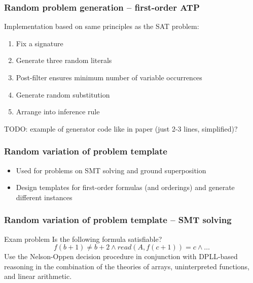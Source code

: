 \documentclass[xcolor={table}]{beamer}
\begin{document}
\begin{frame}
    \frametitle{Random problem generation -- first-order ATP}

    Implementation based on same principles as the SAT problem:
    \begin{enumerate}
        \item Fix a signature
        \item Generate three random literals
        \item Post-filter ensures minimum number of variable occurrences
        \item Generate random substitution
        \item Arrange into inference rule
    \end{enumerate}

    TODO: example of generator code like in paper (just 2-3 lines, simplified)?
\end{frame}



\begin{frame}
  \frametitle{Random variation of problem template}
\begin{itemize}
\item Used for problems on SMT solving and ground superposition
\item Design templates for first-order formulas (and orderings)
  and generate different instances
\end{itemize}
\end{frame}



\begin{frame}
    \frametitle{Random variation of problem template -- SMT solving}

    \begin{block}{Exam problem}
        Is the following formula satisfiable?
        \[
            f(b+1) \neq b+2
            \land
            read(A,f(c+1))=c
            \land
            \dots
        \]
        Use the Nelson-Oppen decision procedure
        in conjunction with DPLL-based reasoning
        in the combination of the theories of
        arrays, uninterpreted functions, and linear arithmetic.
    \end{block}
\end{frame}
\end{document}
